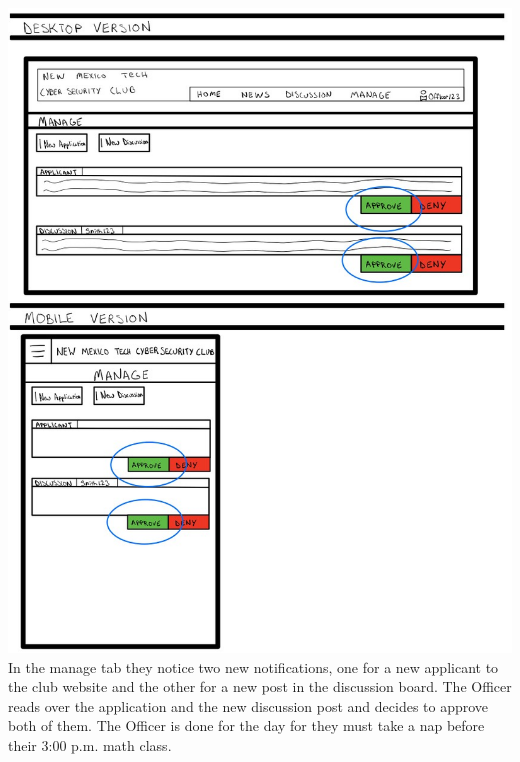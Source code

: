 \documentclass{article}
\begin{document}
\includegraphics[scale=0.60]{officer_2.jpg} In the manage tab they notice two new notifications, one for a new applicant to the club website and the other for a new post in the discussion board.  The Officer reads over the application and the new discussion post and decides to approve both of them.  The Officer is done for the day for they must take a nap before their 3:00 p.m. math class.
 
  
  
\end{document}
